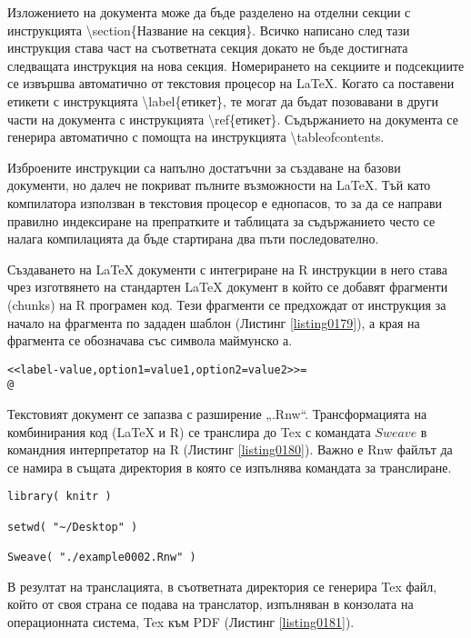 Изложението на документа може да бъде разделено на отделни секции с инструкцията \textbackslash section\{Название на секция\}. Всичко написано след тази инструкция става част на съответната секция докато не бъде достигната следващата инструкция на нова секция. Номерирането на секциите и подсекциите се извършва автоматично от текстовия процесор на LaTeX. Когато са поставени етикети с инструкцията \textbackslash label\{етикет\}, те могат да бъдат позовавани в други части на документа с инструкцията \textbackslash ref\{етикет\}. Съдържанието на документа се генерира автоматично с помощта на инструкцията \textbackslash tableofcontents.

Изброените инструкции са напълно достатъчни за създаване на базови документи, но далеч не покриват пълните възможности на LaTeX. Тъй като компилатора използван в текстовия процесор е еднопасов, то за да се направи правилно индексиране на препратките и таблицата за съдържанието често се налага компилацията да бъде стартирана два пъти последователно. 

Създаването на LaTeX документи с интегриране на R инструкции в него става чрез изготвянето на стандартен LaTeX документ в който се добавят фрагменти (chunks) на R програмен код. Тези фрагменти се предхождат от инструкция за начало на фрагмента по зададен шаблон (Листинг \ref{listing0179}), а края на фрагмента се обозначава със символа маймунско а.

\begin{lstlisting}[caption=Инструкция за R фрагмент в LaTeX документ, label=listing0179]
<<label-value,option1=value1,option2=value2>>=
@
\end{lstlisting}

Текстовият документ се запазва с разширение „.Rnw“. Трансформацията на комбинирания код (LaTeX и R) се транслира до Tex с командата $Sweave$ в командния интерпретатор на R (Листинг \ref{listing0180}). Важно е Rnw файлът да се намира в същата директория в която се изпълнява командата за транслиране. 

\begin{lstlisting}[caption=Транслиране от Rnw до Tex, label=listing0180]
library( knitr )

setwd( "~/Desktop" )

Sweave( "./example0002.Rnw" )
\end{lstlisting}

В резултат на транслацията, в съответната директория се генерира Tex файл, който от своя страна се подава на транслатор, изпълняван в конзолата на операционната система, Tex към PDF (Листинг \ref{listing0181}).

